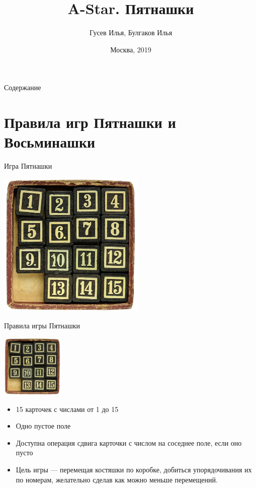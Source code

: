 \documentclass[10pt]{beamer}
\title[\href{https://goo.gl/NRgp8K}{https://goo.gl/NRgp8K} (Term 1)]{A-Star. Пятнашки}
\author[Гусев Илья, Булгаков Илья]{Гусев Илья, Булгаков Илья}
\institute[МФТИ] 
{Московский физико-технический институт\\*}
\date{Москва, 2019}
\begin{document}
\begin{frame}
  \titlepage
\end{frame}

\begin{frame}{Содержание}
\tableofcontents
\end{frame}

\section{Правила игр Пятнашки и Восьминашки}

\begin{frame}[fragile]{Игра Пятнашки}
\begin{center}
    \includegraphics[width=7cm]{Term_2/Source/images/15puzzle.jpg}
\end{center}
\end{frame}

\begin{frame}[fragile]{Правила игры Пятнашки}

\begin{center}
    \includegraphics[width=3cm]{Term_2/Source/images/15puzzle.jpg}
\end{center}

\begin{itemize}
    \item 15 карточек с числами от 1 до 15
    \item Одно пустое поле
    \item Доступна операция сдвига карточки с числом на соседнее поле, если оно пусто
    \item Цель игры — перемещая костяшки по коробке, добиться упорядочивания их по номерам, желательно сделав как можно меньше перемещений.
\end{itemize}

\end{frame}
\end{document}
